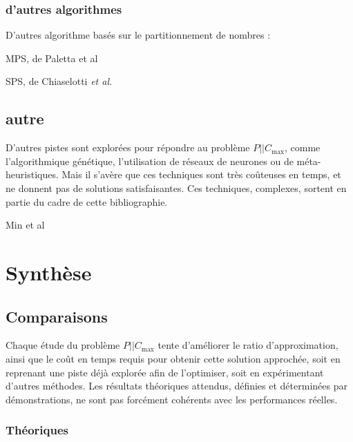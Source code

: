 \documentclass[a4paper,12pt]{report}
\theoremstyle{plain}				%
\theoremstyle{definition}				%
\newcommand\problemGrahamP{$P||C_{\max}$\xspace}
\begin{document}
\subsubsection{d'autres algorithmes}
D'autres algorithme basés sur le partitionnement de nombres :

MPS, de Paletta et al \cite{paletta2007new}

SPS, de Chiaselotti \emph{et al.} \cite{chiaselotti2010minimizing}

 
\subsection{autre}
D'autres pistes sont explorées pour répondre au problème \problemGrahamP, comme l'algorithmique génétique, l'utilisation de réseaux de neurones ou de méta-heuristiques. Mais il s'avère que ces techniques sont très coûteuses en temps, et ne donnent pas de solutions satisfaisantes. Ces techniques, complexes, sortent en partie du cadre de cette bibliographie.

Min et al \cite{min1999genetic}

\section{Synthèse}


\subsection{Comparaisons}

Chaque étude du problème \problemGrahamP tente 
d'améliorer le ratio d'approximation, ainsi que le coût en temps requis 
pour obtenir cette solution approchée, 
soit en reprenant une piste déjà explorée afin de l'optimiser, 
soit en expérimentant d'autres méthodes. 
Les résultats théoriques attendus, définies et déterminées par démonstrations, ne sont pas forcément cohérents avec les performances réelles.

\subsubsection{Théoriques}
\end{document}

